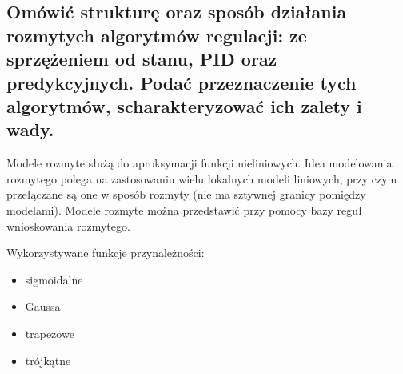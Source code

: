 \subsection{Omówić strukturę oraz sposób działania rozmytych algorytmów regulacji: ze sprzężeniem od stanu, PID oraz predykcyjnych. Podać przeznaczenie tych algorytmów, scharakteryzować ich zalety i wady.}

Modele rozmyte służą do aproksymacji funkcji nieliniowych. Idea modelowania rozmytego polega na zastosowaniu wielu lokalnych modeli liniowych, przy czym przełączane są one w sposób rozmyty (nie ma sztywnej granicy pomiędzy modelami). Modele rozmyte można przedstawić przy pomocy bazy reguł wnioskowania rozmytego.

Wykorzystywane funkcje przynależności:
\begin{itemize}
    \item sigmoidalne
    \item Gaussa
    \item trapezowe
    \item trójkątne
\end{itemize}

